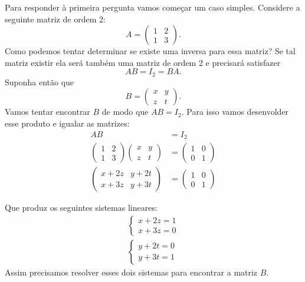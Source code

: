 Para responder à primeira pergunta vamos começar um caso simples. Considere a seguinte matriz de ordem 2:
\[
    A = \begin{pmatrix}
        1 & 2\\1 & 3
    \end{pmatrix}.
\]
Como podemos tentar determinar se existe uma inversa para essa matriz? Se tal matriz existir ela será também uma matriz de ordem 2 e precisará satisfazer
\[
    AB = I_2 = BA.
\]
Suponha então que
\[
    B = \begin{pmatrix}
        x & y\\z & t
    \end{pmatrix}.
\]
Vamos tentar encontrar $B$ de modo que $AB = I_2$. Para isso vamos desenvolder esse produto e igualar as matrizes:
\begin{align*}
    AB &= I_2\\
    \begin{pmatrix}1 & 2\\1 & 3\end{pmatrix}\begin{pmatrix}x & y\\z & t\end{pmatrix} &= \begin{pmatrix}1 & 0\\0 & 1\end{pmatrix}\\
    \begin{pmatrix}x + 2z & y + 2t\\x + 3z & y + 3t\end{pmatrix} &= \begin{pmatrix}1 & 0\\0 & 1\end{pmatrix}
\end{align*}

Que produz os seguintes sistemas lineares:
\begin{align}
    \begin{cases}\label{primeirosistema}
        x + 2z = 1\\
        x + 3z = 0
    \end{cases}\\
    \begin{cases}\label{segundosistema}
        y + 2t = 0\\
        y + 3t = 1
    \end{cases}
\end{align}
Assim precisamos resolver esses dois sistemas para encontrar a matriz $B$.

